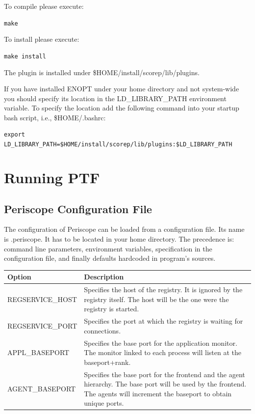 \documentclass[11pt,a4paper, oneside]{book} %
\newcommand{\installloc}[1]{\$HOME/install/#1}
\begin{document}
To compile please execute:

\texttt{make}

To install please execute:

\texttt{make install}

The plugin is installed under \installloc{scorep/lib/plugins}.

If you have installed ENOPT under your home directory and not system-wide you
should specify its location in the LD\_LIBRARY\_PATH environment variable. To
specify the location add the following command into your startup bash script,
i.e., \$HOME/.bashrc:

\texttt{export LD\_LIBRARY\_PATH=\installloc{scorep/lib/plugins}:\$LD\_LIBRARY\_PATH}

\chapter{Running PTF}

\section{Periscope Configuration File}
The configuration of Periscope can be loaded from a configuration file. Its name
is .periscope. It has to be located in your home directory. The precedence is:
command line parameters, environment variables, specification in the
configuration file, and finally defaults hardcoded in program's sources.

\begin{center}
 \begin{longtable}{|l|p{8cm}|} %
  \hline %
  Option & Description \\
  \hline
  REGSERVICE\_HOST & Specifies the host of the registry. It is ignored by the
  registry itself. The host will be the one were the registry is started. \\
  \hline
  REGSERVICE\_PORT & Specifies the port at which the registry is waiting for
  connections. \\
  \hline
  APPL\_BASEPORT & Specifies the base port for the application monitor. The
  monitor linked to each process will listen at the baseport+rank. \\
  \hline
  AGENT\_BASEPORT & Specifies the base port for the frontend and the agent
  hierarchy. The base port will be used by the frontend. The agents will
  increment the baseport to obtain unique ports. \\
  \hline
 \end{longtable}
\end{center}
\end{document}
